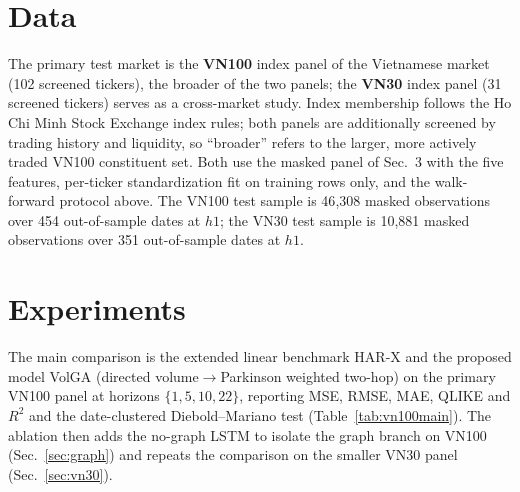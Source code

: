 \documentclass[runningheads]{llncs}
\begin{document}
\section{Data}
The primary test market is the \textbf{VN100} index panel of the Vietnamese market (102 screened
tickers), the broader of the two panels; the \textbf{VN30} index panel (31 screened
tickers) serves as a cross-market study. Index membership follows the Ho Chi Minh Stock Exchange
index rules; both panels are additionally screened by trading history and liquidity, so ``broader''
refers to the larger, more actively traded VN100 constituent set. Both use the masked panel of Sec.~3
with the five features, per-ticker standardization fit on training rows only, and the walk-forward
protocol above. The VN100 test sample is
46{,}308 masked observations over 454 out-of-sample dates at $h1$; the VN30 test sample is 10{,}881
masked observations over 351 out-of-sample dates at $h1$.

\section{Experiments}
The main comparison is the extended linear benchmark HAR-X and the proposed model VolGA (directed
volume$\to$Parkinson weighted two-hop) on the primary VN100 panel at horizons $\{1,5,10,22\}$,
reporting MSE, RMSE, MAE, QLIKE and $R^2$ and the date-clustered Diebold--Mariano test
(Table~\ref{tab:vn100main}). The ablation then adds the no-graph LSTM to isolate the graph branch on
VN100 (Sec.~\ref{sec:graph}) and repeats the comparison on the smaller VN30 panel (Sec.~\ref{sec:vn30}).
\end{document}
